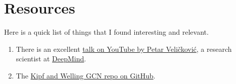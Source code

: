 



\vspace{2mm}

\vspace{2mm}








\section{\label{sec:reading}Resources}

\justifying
Here is a quick list of things that I found interesting and relevant.

\begin{raggedright}
	\begin{enumerate}
		\item There is an excellent \href{https://www.youtube.com/watch?v=8owQBFAHw7E}{talk on YouTube by Petar Veličković}, a research scientist at \href{https://deepmind.com/about}{DeepMind}.
		\item The \href{https://github.com/tkipf/gcn}{Kipf and Welling GCN repo on GitHub}.
    \end{enumerate}
\end{raggedright}
\vspace{2mm}

\clearpage
\begin{versionhistory}
\end{versionhistory}
\nocite{*}




